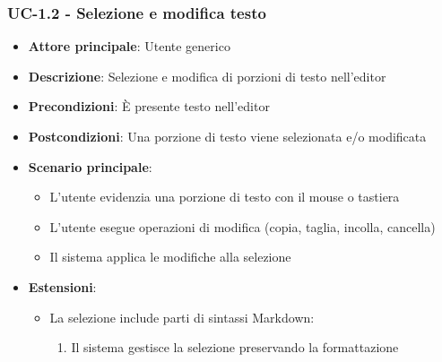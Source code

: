 \documentclass[11pt,a4paper]{article}
\begin{document}
\subsubsection{UC-1.2 - Selezione e modifica testo}
\begin{itemize}
    \item \textbf{Attore principale}: Utente generico
    \item \textbf{Descrizione}: Selezione e modifica di porzioni di testo nell'editor
    \item \textbf{Precondizioni}: È presente testo nell'editor
    \item \textbf{Postcondizioni}: Una porzione di testo viene selezionata e/o modificata
    \item \textbf{Scenario principale}:
        \begin{itemize}
            \item L'utente evidenzia una porzione di testo con il mouse o tastiera
            \item L'utente esegue operazioni di modifica (copia, taglia, incolla, cancella)
            \item Il sistema applica le modifiche alla selezione
        \end{itemize}
    \item \textbf{Estensioni}:
        \begin{itemize}
            \item La selezione include parti di sintassi Markdown:
                \begin{enumerate}
                    \item Il sistema gestisce la selezione preservando la formattazione
                \end{enumerate}
        \end{itemize}
\end{itemize}
\end{document}
